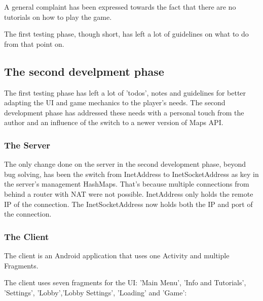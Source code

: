 \begin{enumerate}
  A general complaint has been expressed towards the fact that there are no
  tutorials on how to play the game.
\end{enumerate}

The first testing phase, though short, has left a lot of guidelines on what to
do from that point on.\newline

\subsection{The second develpment phase}

The first testing phase has left a lot of 'todos', notes and guidelines for
better adapting the UI and game mechanics to the player's needs. The second
development phase has addressed these needs with a personal touch from the
author and an influence of the switch to a newer version of Maps API.

\subsubsection{The Server}

The only change done on the server in the second development phase, beyond bug
solving, has been the switch from InetAddress to InetSocketAddress as key in the
server's management HashMaps. That's because multiple connections from behind a
router with NAT were not possible. InetAddress only holds the remote IP of the
connection. The InetSocketAddress now holds both the IP and port of the
connection.

\subsubsection{The Client}

The client is an Android application that uses one Activity and multiple
Fragments. 

The client uses seven fragments for the UI: 'Main Menu', 'Info and
Tutorials', 'Settings', 'Lobby','Lobby Settings', 'Loading' and 'Game':

